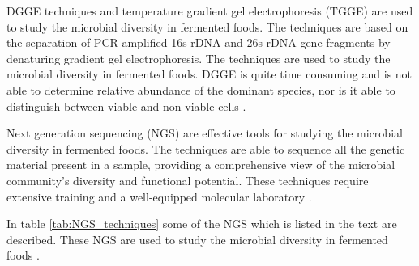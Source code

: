 DGGE techniques and temperature gradient gel electrophoresis (TGGE) are used to study the microbial diversity in fermented foods. The techniques are based on the separation of PCR-amplified 16s rDNA and 26s rDNA gene fragments by denaturing gradient gel electrophoresis. The techniques are used to study the microbial diversity in fermented foods. DGGE is quite time consuming and is not able to determine relative abundance of the dominant species, nor is it able to distinguish between viable and non-viable cells \cite*{L1-DiversityMicro}.

Next generation sequencing (NGS) are effective tools for studying the microbial diversity in fermented foods. The techniques are able to sequence all the genetic material present in a sample, providing a comprehensive view of the microbial community's diversity and functional potential. These techniques require extensive training and a well-equipped molecular laboratory \cite*{L1-DiversityMicro}.

In table \ref{tab:NGS_techniques} some of the NGS which is listed in the text are described. These NGS are used to study the microbial diversity in fermented foods \cite*{L1-DiversityMicro}.


